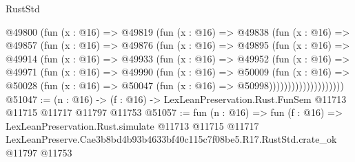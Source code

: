 \begin{lexlean}{RustStd}
\begin{coremodule}
              @49800
                (fun (x : @16) =>
                @49819
                  (fun (x : @16) =>
                  @49838
                    (fun (x : @16) =>
                    @49857
                      (fun (x : @16) =>
                      @49876
                        (fun (x : @16) =>
                        @49895
                          (fun (x : @16) =>
                          @49914
                            (fun (x : @16) =>
                            @49933
                              (fun (x : @16) =>
                              @49952
                                (fun (x : @16) =>
                                @49971
                                  (fun (x : @16) =>
                                  @49990
                                    (fun (x : @16) =>
                                    @50009
                                      (fun (x : @16) =>
                                      @50028
                                        (fun (x : @16) =>
                                        @50047 (fun (x : @16) => @50998))))))))))))))))))))
@51047 := (n : @16) ->
  (f : @16) -> LexLeanPreservation.Rust.FunSem @11713 @11715 @11717 @11797 @11753
@51057 := fun (n : @16) =>
  fun (f : @16) =>
  LexLeanPreservation.Rust.simulate
    @11713
    @11715
    @11717
    LexLeanPreserve.Cae3b8bd4b93b4633bf40c115c7f08be5.R17.RustStd.crate_ok
    @11797
    @11753
\end{coremodule}
\end{lexlean}
